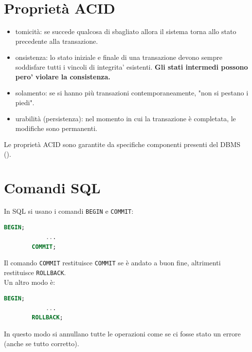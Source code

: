 \documentclass[12pt, a4paper]{report}
\begin{document}
    \section{Proprietà ACID}
    \begin{itemize}
        \item {}tomicità: se succede qualcosa di sbagliato allora il sistema torna allo stato precedente alla transazione.
        \item {}onsistenza: lo stato iniziale e finale di una transazione devono sempre soddisfare tutti i vincoli di integrita' esistenti. \textbf{Gli stati intermedi possono pero' violare la consistenza.} 
        \item {}solamento: se si hanno più transazioni contemporaneamente, "non si pestano i piedi".
        \item {}urabilità (persistenza): nel momento in cui la transazione è completata, le modifiche sono permanenti. 
    \end{itemize}
    Le proprietà ACID sono garantite da specifiche componenti presenti del DBMS ().
    \section{Comandi SQL}
    In SQL si usano i comandi \texttt{BEGIN} e \texttt{COMMIT}:
    \begin{lstlisting}[language=SQL]
        BEGIN;
            ...
        COMMIT;
    \end{lstlisting}
    Il comando \texttt{COMMIT} restituisce \texttt{COMMIT} se è andato a buon fine, altrimenti restituisce \texttt{ROLLBACK}.\\
    Un altro modo è:
    \begin{lstlisting}[language=SQL]
        BEGIN;
            ...
        ROLLBACK;
    \end{lstlisting}
    In questo modo si annullano tutte le operazioni come se ci fosse stato un errore (anche se tutto corretto).\\
\end{document}
